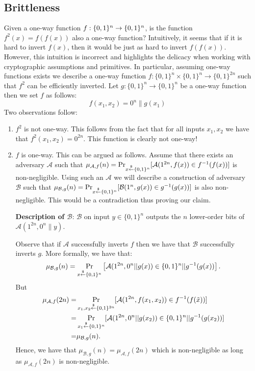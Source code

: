\subsection{Brittleness}
Given a one-way function $f : \{0,1\}^{n}\rightarrow\{0,1\}^{n}$, is the function $f^2(x) = f(f(x))$ also a one-way function?  Intuitively, it seems that if it is hard to invert $f(x)$, then it would be just as hard to invert $f(f(x))$. 
However, this intuition is incorrect and highlights the delicacy when working with cryptographic assumptions and primitives. In particular, assuming one-way functions exists we describe a one-way function $f: \{0,1\}^{n}\times \{0,1\}^{n} \rightarrow \{0,1\}^{2n}$ such that $f^2$ can be efficiently inverted.
Let $g: \{0,1\}^n \rightarrow \{0,1\}^n$ be a one-way function then we set $f$ as follows:
$$f(x_1,x_2) = 0^{n}\|g(x_1)$$
Two observations follow:
\begin{enumerate} 
  \item $f^2$ is not one-way. This follows from the fact that for all inputs $x_1, x_2$ we have that $f^2(x_1,x_2) = 0^{2n}$. This function is clearly not one-way!
  \item $f$ is one-way. This can be argued as follows. Assume that there exists an adversary $\mathcal{A}$ such that $\mu_{\mathcal{A},f}(n) = \Pr_{x \stackrel{\$}{\leftarrow} \{0,1\}^{n}}[ \mathcal{A}(1^{2n}, f(x)) \in f^{-1}(f(x))]$ is non-negligible. Using such an $\mathcal{A}$ we will describe a construction of adversary $\mathcal{B}$ such that $\allowbreak\mu_{\mathcal{B},g}(n) = \Pr_{x \stackrel{\$}{\leftarrow} \{0,1\}^{n}}[ \mathcal{B}(1^n, g(x)) \in g^{-1}(g(x))]$ is also non-negligible. This would be a contradiction thus proving our claim.

      \textbf{Description of $\mathcal{B}$}: $\mathcal{B}$ on input $y \in\{0,1\}^n$ outputs the $n$ lower-order bits of  $\mathcal{A}(1^{2n}, 0^{n}\|y)$.

      Observe that if $\mathcal{A}$ successfully inverts $f$ then we have that $\mathcal{B}$ successfully inverts $g$. More formally, we have that:
      $$\mu_{\mathcal{B},g}(n) = \Pr_{x \stackrel{\$}{\leftarrow} \{0,1\}^{n}}\left[ \mathcal{A}(1^{2n}, 0^n || g(x)) \in \{0,1\}^n || g^{-1}(g(x))\right].$$
      But
      \begin{align*}
      \mu_{\mathcal{A},f}(2n) =& \Pr_{x_1, x_2 \stackrel{\$}{\leftarrow} \{0,1\}^{2n}}[ \mathcal{A}(1^{2n}, f(x_1, x_2)) \in f^{-1}(f(\tilde x))]\\
      = & \Pr_{x_1 \stackrel{\$}{\leftarrow} \{0,1\}^{n}}[ \mathcal{A}(1^{2n}, 0^n || g(x_2)) \in \{0,1\}^n || g^{-1}(g(x_2))] \\
      = & \mu_{\mathcal{B},g}(n).
      \end{align*}
      Hence, we have that $\mu_{\mathcal{B},g}(n) = \mu_{\mathcal{A},f}(2n)$ which is non-negligible as long as $\mu_{\mathcal{A},f}(2n)$  is non-negligible.
\end{enumerate}


